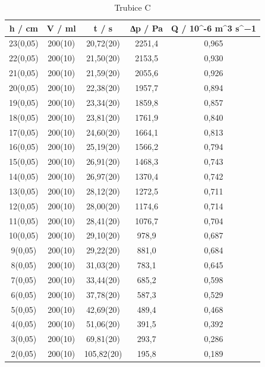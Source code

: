     \begin{table}[h]
        \centering
        \caption{Trubice C}
        \label{tab:trubice C}
        \begin{tabular}{|c|c|c|c|c|}
        \hline
            h / cm   & V / ml  & t / s      & ∆p / Pa & Q / 10^{-6} m^3 s^−1  \\ 
        \hline
            23(0,05) & 200(10) & 20,72(20)  & 2251,4  & 0,965             \\
            22(0,05) & 200(10) & 21,50(20)  & 2153,5  & 0,930             \\
            21(0,05) & 200(10) & 21,59(20)  & 2055,6  & 0,926             \\
            20(0,05) & 200(10) & 22,38(20)  & 1957,7  & 0,894             \\
            19(0,05) & 200(10) & 23,34(20)  & 1859,8  & 0,857             \\
            18(0,05) & 200(10) & 23,81(20)  & 1761,9  & 0,840             \\
            17(0,05) & 200(10) & 24,60(20)  & 1664,1  & 0,813             \\
            16(0,05) & 200(10) & 25,19(20)  & 1566,2  & 0,794             \\
            15(0,05) & 200(10) & 26,91(20)  & 1468,3  & 0,743             \\
            14(0,05) & 200(10) & 26,97(20)  & 1370,4  & 0,742             \\
            13(0,05) & 200(10) & 28,12(20)  & 1272,5  & 0,711             \\
            12(0,05) & 200(10) & 28,00(20)  & 1174,6  & 0,714             \\
            11(0,05) & 200(10) & 28,41(20)  & 1076,7  & 0,704             \\
            10(0,05) & 200(10) & 29,10(20)  & 978,9   & 0,687             \\
            9(0,05)  & 200(10) & 29,22(20)  & 881,0   & 0,684             \\
            8(0,05)  & 200(10) & 31,03(20)  & 783,1   & 0,645             \\
            7(0,05)  & 200(10) & 33,44(20)  & 685,2   & 0,598             \\
            6(0,05)  & 200(10) & 37,78(20)  & 587,3   & 0,529             \\
            5(0,05)  & 200(10) & 42,69(20)  & 489,4   & 0,468             \\
            4(0,05)  & 200(10) & 51,06(20)  & 391,5   & 0,392             \\
            3(0,05)  & 200(10) & 69,81(20)  & 293,7   & 0,286             \\
            2(0,05)  & 200(10) & 105,82(20) & 195,8   & 0,189             \\
        \hline
        \end{tabular}
    \end{table}
    
